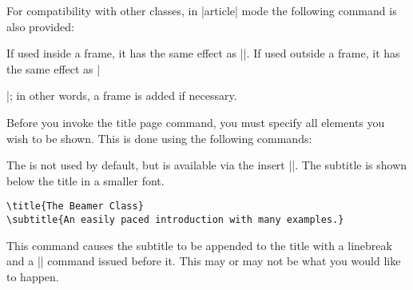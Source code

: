 For compatibility with other classes, in |article| mode the following command is also provided:

\begin{command}{\maketitle}
  \beamernote
  If used inside a frame, it has the same effect as |\titlepage|. If used outside a frame, it has the same effect as |\begin{frame}\titlepage\end{frame}|; in other words, a frame is added if necessary.
\end{command}

Before you invoke the title page command, you must specify all elements you wish to be shown. This is done using the following commands:


\begin{command}{\subtitle{}}
  The  is not used by default, but is available via the insert |\insertshortsubtitle|. The subtitle is shown below the title in a smaller font.
  \example
\begin{verbatim}
\title{The Beamer Class}
\subtitle{An easily paced introduction with many examples.}
\end{verbatim}

  \articlenote
  This command causes the subtitle to be appended to the title with a linebreak and a |\normalsize| command issued before it. This may or may not be what you would like to happen.
\end{command}


